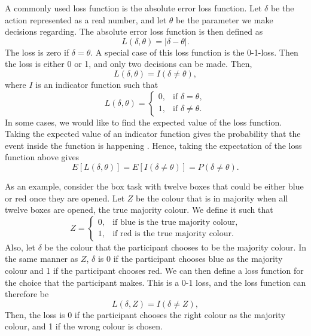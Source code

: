 A commonly used loss function is the absolute error loss function. Let $\delta$ be the 
action represented as a real number, and let $\theta$ be the parameter we make decisions regarding. The absolute error loss function is then defined as
\begin{equation*}
    L(\delta,\theta) = |\delta-\theta|.
\end{equation*}
The loss is zero if $\delta=\theta$. A special case of this loss function is the 0-1-loss. Then the loss is either 0 or 1, and only two decisions can be made. Then, 
\begin{equation*}
    L(\delta,\theta) = I(\delta \neq \theta),
\end{equation*}
where $I$ is an indicator function such that
\begin{equation*}
    L(\delta,\theta) =
    \begin{cases}
        0,&  \text{if } \delta = \theta, \\
        1,&  \text{if } \delta \neq \theta.
    \end{cases}
\end{equation*}
In some cases, we would like to find the expected value of the loss function. Taking the expected value of an indicator function gives the probability that the event inside the function is happening \citep{algdat}. Hence, taking the expectation of the loss function above gives
\begin{equation}
\label{expectation_of_loss_func_general}
    E[L(\delta,\theta)] = E[I(\delta\neq\theta)] = P(\delta\neq\theta).
\end{equation}



As an example, consider the box task with twelve boxes  that could be either blue or red once they are opened. Let $Z$ be the colour that is in majority when all twelve boxes are opened, the true majority colour. We define it such that
\begin{equation*}
    Z = 
    \begin{cases}
        0,& \text{if blue is the true majority colour,} \\
        1,& \text{if red is the true majority colour.}
    \end{cases}
\end{equation*}
Also, let $\delta$ be the colour that the participant chooses to be the majority colour. In the same manner as $Z$, $\delta$ is 0 if the participant chooses blue as the majority colour and 1 if the participant chooses red. We can then define a loss function for the choice that the participant makes. This is a 0-1 loss, and the loss function can therefore be
\begin{equation*}
    L(\delta,Z) = I(\delta \neq Z),
\end{equation*}
Then, the loss is 0 if the participant chooses the right colour as the majority colour, and 1 if the wrong colour is chosen. 

